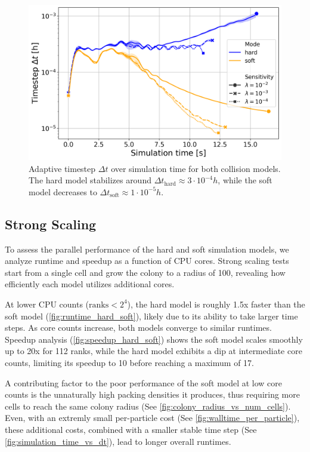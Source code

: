 \documentclass[conference]{IEEEtran}
\begin{document}
\begin{figure}[H]
    \centering
    \includegraphics[width=\linewidth]{figures/comparison_plots/combined_simulation_time [s]_vs_dt.png}
    \caption{Adaptive timestep $\Delta t$ over simulation time for both collision models. The hard model stabilizes around ${\Delta t}_{\text{hard}} \approx 3 \cdot 10^{-4} h$, while the soft model decreases to ${\Delta t}_{\text{soft}} \approx 1 \cdot 10^{-5} h$.} \label{fig:simulation_time_vs_dt}
\end{figure}


\subsection{Strong Scaling}

To assess the parallel performance of the hard and soft simulation models, we analyze runtime and speedup as a function of CPU cores. Strong scaling tests start from a single cell and grow the colony to a radius of 100, revealing how efficiently each model utilizes additional cores.

At lower CPU counts ($\text{ranks}< 2^4$), the hard model is roughly 1.5x faster than the soft model (\autoref{fig:runtime_hard_soft}), likely due to its ability to take larger time steps. As core counts increase, both models converge to similar runtimes. Speedup analysis (\autoref{fig:speedup_hard_soft}) shows the soft model scales smoothly up to 20x for 112 ranks, while the hard model exhibits a dip at intermediate core counts, limiting its speedup to 10 before reaching a maximum of 17.

A contributing factor to the poor performance of the soft model at low core counts is the unnaturally high packing densities it produces, thus requiring more cells to reach the same colony radius (See \autoref{fig:colony_radius_vs_num_cells}). Even, with an extremly small per-particle cost (See \autoref{fig:walltime_per_particle}), these additional costs, combined with a smaller stable time step (See \autoref{fig:simulation_time_vs_dt}), lead to longer overall runtimes.
\end{document}
